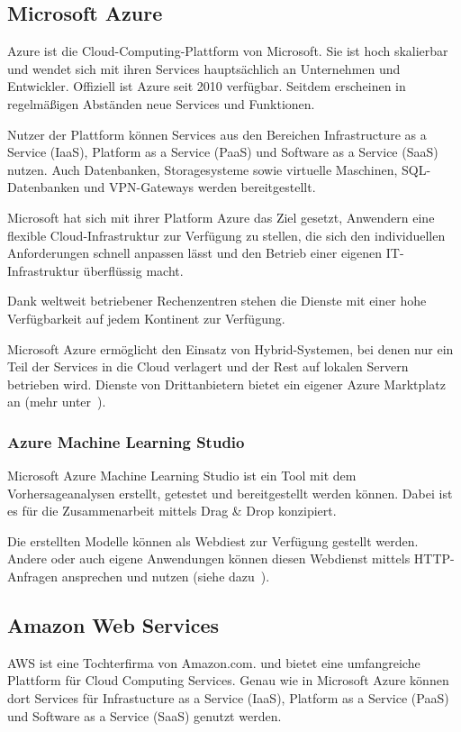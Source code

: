 \subsection{Microsoft Azure}
Azure ist die Cloud-Computing-Plattform von Microsoft. Sie ist hoch skalierbar und wendet sich mit ihren Services
hauptsächlich an Unternehmen und Entwickler. Offiziell ist Azure seit 2010 verfügbar. Seitdem erscheinen in regelmäßigen
Abständen neue Services und Funktionen.

Nutzer der Plattform können Services aus den Bereichen Infrastructure as a Service (IaaS), Platform as a Service (PaaS)
und Software as a Service (SaaS) nutzen. Auch Datenbanken, Storagesysteme sowie virtuelle Maschinen, SQL-Datenbanken und
VPN-Gateways werden bereitgestellt.

Microsoft hat sich mit ihrer Platform Azure das Ziel gesetzt, Anwendern eine flexible Cloud-Infrastruktur zur Verfügung
zu stellen, die sich den individuellen Anforderungen schnell anpassen lässt und den Betrieb einer eigenen IT-Infrastruktur
überflüssig macht.

Dank weltweit betriebener Rechenzentren stehen die Dienste mit einer hohe Verfügbarkeit auf jedem Kontinent zur Verfügung.

Microsoft Azure ermöglicht den Einsatz von Hybrid-Systemen, bei denen nur ein Teil der Services in die Cloud verlagert
und der Rest auf lokalen Servern betrieben wird. Dienste von Drittanbietern bietet ein eigener Azure Marktplatz an
(mehr unter~\cite{online_grundlagen_azure}).

\subsubsection{Azure Machine Learning Studio}
Microsoft Azure Machine Learning Studio ist ein Tool mit dem Vorhersageanalysen erstellt, getestet und bereitgestellt
werden können. Dabei ist es für die Zusammenarbeit mittels Drag \& Drop konzipiert.

Die erstellten Modelle können als Webdiest zur Verfügung gestellt werden. Andere oder auch eigene Anwendungen können
diesen Webdienst mittels HTTP-Anfragen ansprechen und nutzen (siehe dazu~\cite{article_grundlagen_azure_studio}).

\subsection{Amazon Web Services}
AWS ist eine Tochterfirma von Amazon.com. und bietet eine umfangreiche Plattform für Cloud Computing Services. Genau
wie in Microsoft Azure können dort Services für Infrastucture as a Service (IaaS), Platform as a Service (PaaS) und
Software as a Service (SaaS) genutzt werden.

